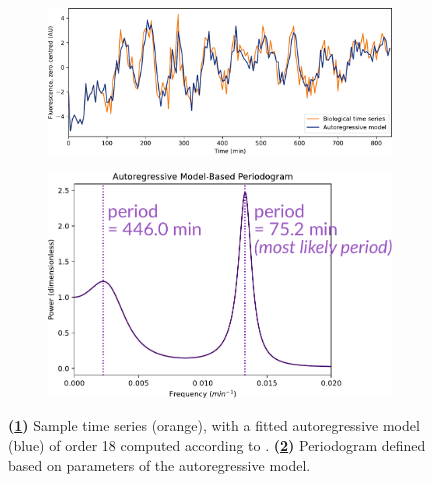 \begin{figure}
  \centering
  \begin{subfigure}[htpb]{0.6\textwidth}
   \centering
   \includegraphics[width=\textwidth]{timeseries_example_for_ar_edit}
   \caption{
   }
   \label{fig:analysis-ar-timeseries}
  \end{subfigure}%
  \begin{subfigure}[htpb]{0.4\textwidth}
   \centering
   \includegraphics[width=\textwidth]{ar}
   \caption{
   }
   \label{fig:analysis-ar-periodogram}
  \end{subfigure}

  \caption[
    Sample time series, with a fitted autoregressive model computed according to \textcite{jiaFrequencyDomainAnalysis2020}.
  ]{
    \textbf{(\ref{fig:analysis-ar-timeseries})}
    Sample time series (orange), with a fitted autoregressive model (blue) of order 18 computed according to \textcite{jiaFrequencyDomainAnalysis2020}.
    \textbf{(\ref{fig:analysis-ar-periodogram})}
    Periodogram defined based on parameters of the autoregressive model.
  }
  \label{fig:analysis-ar}
\end{figure}

